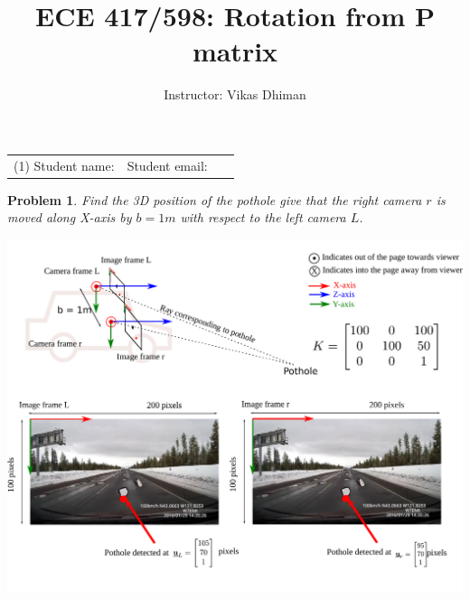 \documentclass[times,singlecolumn]{article}
\title{ECE 417/598: Rotation from P matrix}
\author{Instructor: Vikas Dhiman}
\newtheorem{prob}{Problem}
\begin{document}
\maketitle
\begin{tabular}{p{0.5\linewidth}p{0.5\linewidth}}
  (1) Student name:& Student email: \\
\end{tabular}

\begin{prob}
  Find the 3D position of the pothole give that the right camera $r$  is moved
  along X-axis by $b=1m$ with respect to the left camera $L$. 
\end{prob}

\includegraphics[width=\linewidth]{media/image-road-triangulation-ray-ray.pdf}
\end{document}
